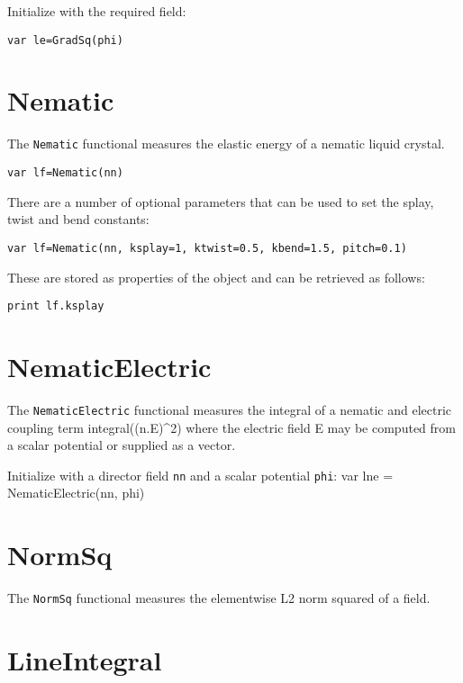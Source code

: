 Initialize with the required field:

\begin{lstlisting}
var le=GradSq(phi)
\end{lstlisting}

\hypertarget{nematic}{%
\section{Nematic}\label{nematic}}

The \texttt{Nematic} functional measures the elastic energy of a nematic
liquid crystal.

\begin{lstlisting}
var lf=Nematic(nn)
\end{lstlisting}

There are a number of optional parameters that can be used to set the
splay, twist and bend constants:

\begin{lstlisting}
var lf=Nematic(nn, ksplay=1, ktwist=0.5, kbend=1.5, pitch=0.1)
\end{lstlisting}

These are stored as properties of the object and can be retrieved as
follows:

\begin{lstlisting}
print lf.ksplay
\end{lstlisting}

\hypertarget{nematicelectric}{%
\section{NematicElectric}\label{nematicelectric}}

The \texttt{NematicElectric} functional measures the integral of a
nematic and electric coupling term integral((n.E)\^{}2) where the
electric field E may be computed from a scalar potential or supplied as
a vector.

Initialize with a director field \texttt{nn} and a scalar potential
\texttt{phi}: var lne = NematicElectric(nn, phi)

\hypertarget{normsq}{%
\section{NormSq}\label{normsq}}

The \texttt{NormSq} functional measures the elementwise L2 norm squared
of a field.

\hypertarget{lineintegral}{%
\section{LineIntegral}\label{lineintegral}}


